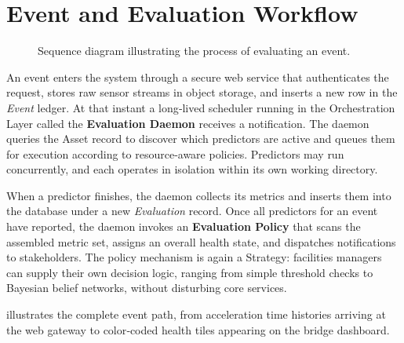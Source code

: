 \section{Event and Evaluation Workflow}\label{sec:policy}

\begin{figure}[ht]
    \centering
    \resizebox{0.9\linewidth}{!}{}
    \caption{Sequence diagram illustrating the process of evaluating an event.}
    \label{fig:irie-sequences}
\end{figure}

An event enters the system through a secure web service that
authenticates the request, stores raw sensor streams in object storage,
and inserts a new row in the \emph{Event} ledger. 
At that instant a long‑lived scheduler running in the
Orchestration Layer called the \textbf{Evaluation Daemon} receives a notification. 
The daemon queries the Asset record to discover which predictors are active and queues them for
execution according to resource‑aware policies. 
Predictors may run concurrently, and each operates in isolation within its own working directory.

When a predictor finishes, the daemon collects its metrics and inserts
them into the database under a new \emph{Evaluation} record. 
Once all predictors for an event have reported, the daemon invokes an
\textbf{Evaluation Policy} that scans the assembled metric set, assigns
an overall health state, and dispatches notifications to stakeholders.
The policy mechanism is again a Strategy: facilities managers can supply
their own decision logic, ranging from simple threshold checks to
Bayesian belief networks, without disturbing core services.

 illustrates the complete event path, from acceleration
time histories arriving at the web gateway to color‑coded health tiles
appearing on the bridge dashboard. 




\FloatBarrier
